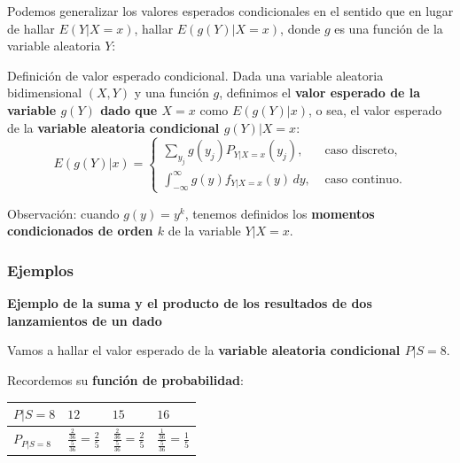 \documentclass[]{book}
\begin{document}
Podemos generalizar los valores esperados condicionales en el sentido que en lugar de hallar \(E(Y|X=x)\), hallar \(E(g(Y)|X=x)\), donde \(g\) es una función de la variable aleatoria \(Y\):

Definición de valor esperado condicional.
Dada una variable aleatoria bidimensional \((X,Y)\) y una función \(g\), definimos el \textbf{valor esperado de la variable \(g(Y)\) dado que \(X=x\)} como \(E(g(Y)|x)\), o sea, el valor esperado de la \textbf{variable aleatoria condicional \(g(Y)|X=x\)}:
\[
E(g(Y)|x)=\begin{cases}
\sum_{y_j} g(y_j) P_{Y|X=x}(y_j), & \mbox{ caso discreto,}\\
\int_{-\infty}^\infty g(y) f_{Y|X=x}(y)\,dy, & \mbox{ caso continuo.}
\end{cases}
\]

Observación: cuando \(g(y)=y^k\), tenemos definidos los \textbf{momentos condicionados de orden \(k\)} de la variable \(Y|X=x\).

\hypertarget{ejemplos-8}{%
\subsubsection{Ejemplos}\label{ejemplos-8}}

\textbf{Ejemplo de la suma y el producto de los resultados de dos lanzamientos de un dado}

Vamos a hallar el valor esperado de la \textbf{variable aleatoria condicional \(P|S=8\)}.

Recordemos su \textbf{función de probabilidad}:

\begin{longtable}[]{@{}llll@{}}
\toprule
\begin{minipage}[b]{0.22\columnwidth}\raggedright
\(P|S=8\)\strut
\end{minipage} & \begin{minipage}[b]{0.22\columnwidth}\raggedright
\(12\)\strut
\end{minipage} & \begin{minipage}[b]{0.22\columnwidth}\raggedright
\(15\)\strut
\end{minipage} & \begin{minipage}[b]{0.22\columnwidth}\raggedright
\(16\)\strut
\end{minipage}\tabularnewline
\midrule
\endhead
\begin{minipage}[t]{0.22\columnwidth}\raggedright
\(P_{P|S=8}\)\strut
\end{minipage} & \begin{minipage}[t]{0.22\columnwidth}\raggedright
\(\frac{\frac{2}{36}}{\frac{5}{36}}=\frac{2}{5}\)\strut
\end{minipage} & \begin{minipage}[t]{0.22\columnwidth}\raggedright
\(\frac{\frac{2}{36}}{\frac{5}{36}}=\frac{2}{5}\)\strut
\end{minipage} & \begin{minipage}[t]{0.22\columnwidth}\raggedright
\(\frac{\frac{1}{36}}{\frac{5}{36}}=\frac{1}{5}\)\strut
\end{minipage}\tabularnewline
\bottomrule
\end{longtable}
\end{document}
